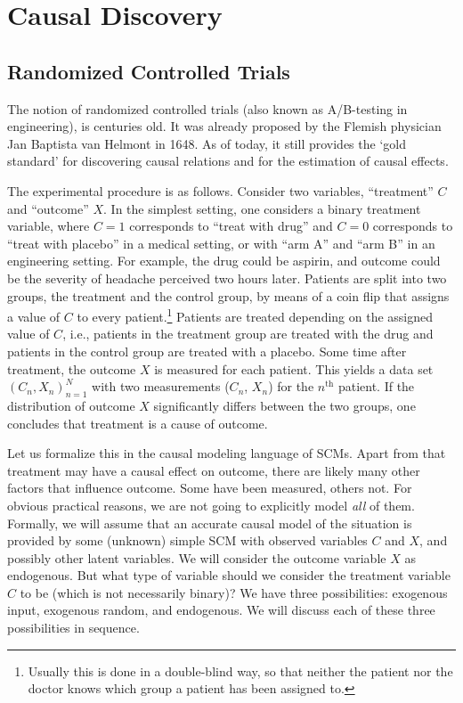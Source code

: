 \section{Causal Discovery}


\subsection{Randomized Controlled Trials}

The notion of randomized controlled trials (also known as A/B-testing in engineering), 
is centuries old. It was already proposed by the Flemish physician Jan Baptista van
Helmont \cite{vanHelmont1648} in 1648. As of today, it still provides the `gold standard'
for discovering causal relations and for the estimation of causal effects.

The experimental procedure is as follows.
Consider two variables, ``treatment'' $C$ and ``outcome'' $X$. 
In the simplest setting, one considers a 
binary treatment variable, where $C=1$ corresponds to ``treat with drug'' and
$C=0$ corresponds to ``treat with placebo'' in a medical setting, or with ``arm A''
and ``arm B'' in an engineering setting. For example, the drug could be aspirin,
and outcome could be the severity of headache perceived two
hours later. Patients are split into two groups,
the treatment and the control group, by means of a coin flip that assigns a value
of $C$ to every patient.\footnote{Usually this is done in a double-blind way, so
that neither the patient nor the doctor knows which group a patient has been assigned
to.} Patients are treated depending on the assigned value of $C$, i.e., patients in the
treatment group are treated with the drug and patients in the control group are treated
with a placebo. Some time after treatment, the outcome $X$ is measured for each patient. 
This yields a data set $(C_n,X_n)_{n=1}^N$
with two measurements ($C_n$, $X_n$) for the $n^{\mathrm{th}}$ patient. 
If the distribution of outcome $X$ significantly differs between the two groups,
one concludes that treatment is a cause of outcome. 

Let us formalize this in the causal modeling language of SCMs.
Apart from that treatment may have a causal 
effect on outcome, there are likely many other factors that influence outcome. Some
have been measured, others not. For obvious practical reasons, we are not going 
to explicitly model \emph{all} of them. Formally, we will assume that an accurate
causal model of the situation is provided by some (unknown) simple SCM with observed
variables $C$ and $X$, and possibly other latent variables.
We will consider the outcome variable $X$ as endogenous. 
But what type of variable should we consider
the treatment variable $C$ to be (which is not necessarily binary)?
We have three possibilities: exogenous input, exogenous random, and endogenous. We will
discuss each of these three possibilities in sequence.

